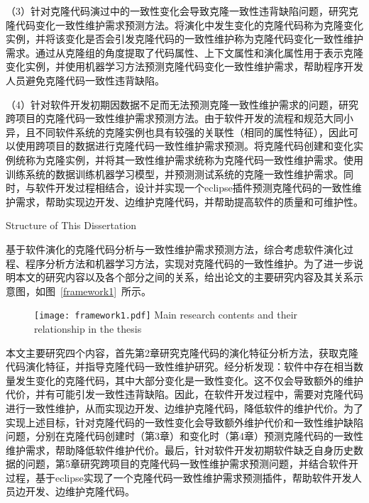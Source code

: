 （3）针对克隆代码演过中的一致性变化会导致克隆一致性违背缺陷问题，研究克隆代码变化一致性维护需求预测方法。将演化中发生变化的克隆代码称为克隆变化实例，并将该变化是否会引发克隆代码的一致性维护称为克隆代码变化一致性维护需求。通过从克隆组的角度提取了代码属性、上下文属性和演化属性用于表示克隆变化实例，并使用机器学习方法预测克隆代码变化一致性维护需求，帮助程序开发人员避免克隆代码一致性违背缺陷。

（4）针对软件开发初期因数据不足而无法预测克隆一致性维护需求的问题，研究跨项目的克隆代码一致性维护需求预测方法。由于软件开发的流程和规范大同小异，且不同软件系统的克隆实例也具有较强的关联性（相同的属性特征），因此可以使用跨项目的数据进行克隆代码一致性维护需求预测。将克隆代码创建和变化实例统称为克隆实例，并将其一致性维护需求统称为克隆代码一致性维护需求。使用训练系统的数据训练机器学习模型，并预测测试系统的克隆一致性维护需求。同时，与软件开发过程相结合，设计并实现一个eclipse插件预测克隆代码的一致性维护需求，帮助实现边开发、边维护克隆代码，并帮助提高软件的质量和可维护性。

{Structure of This Dissertation}

基于软件演化的克隆代码分析与一致性维护需求预测方法，综合考虑软件演化过程、程序分析方法和机器学习方法，实现对克隆代码的一致性维护。为了进一步说明本文的研究内容以及各个部分之间的关系，给出论文的主要研究内容及其关系示意图，如图~\ref{framework1}~所示。

\begin{figure}[htbp]
\centering
\texttt{[image: framework1.pdf]}
{Main research contents and their relationship in the thesis}
\vspace{-1em}
\end{figure}

本文主要研究四个内容，首先第2章研究克隆代码的演化特征分析方法，获取克隆代码演化特征，并指导克隆代码一致性维护研究。经分析发现：软件中存在相当数量发生变化的克隆代码，其中大部分变化是一致性变化。这不仅会导致额外的维护代价，并有可能引发一致性违背缺陷。因此，在软件开发过程中，需要对克隆代码进行一致性维护，从而实现边开发、边维护克隆代码，降低软件的维护代价。为了实现上述目标，针对克隆代码的一致性变化会导致额外维护代价和一致性维护缺陷问题，分别在克隆代码创建时（第3章）和变化时（第4章）预测克隆代码的一致性维护需求，帮助降低软件维护代价。最后，针对软件开发初期软件缺乏自身历史数据的问题，第5章研究跨项目的克隆代码一致性维护需求预测问题，并结合软件开过程，基于eclipse实现了一个克隆代码一致性维护需求预测插件，帮助软件开发人员边开发、边维护克隆代码。

